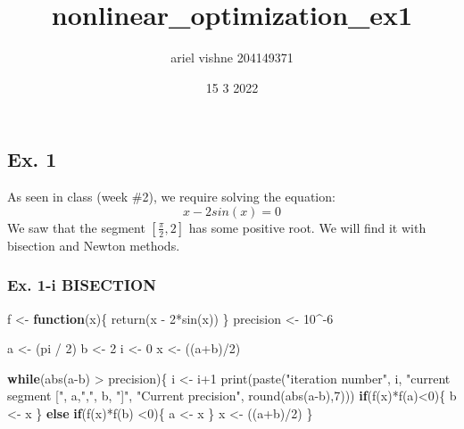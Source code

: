 \documentclass[
]{article}
\title{nonlinear\_optimization\_ex1}
\author{ariel vishne 204149371}
\date{15 3 2022}
\newenvironment{Shaded}{\begin{snugshade}}{\end{snugshade}}
\newcommand{\ControlFlowTok}[1]{\textcolor[rgb]{0.13,0.29,0.53}{\textbf{#1}}}
\newcommand{\DecValTok}[1]{\textcolor[rgb]{0.00,0.00,0.81}{#1}}
\newcommand{\FunctionTok}[1]{\textcolor[rgb]{0.00,0.00,0.00}{#1}}
\newcommand{\NormalTok}[1]{#1}
\newcommand{\OtherTok}[1]{\textcolor[rgb]{0.56,0.35,0.01}{#1}}
\newcommand{\SpecialCharTok}[1]{\textcolor[rgb]{0.00,0.00,0.00}{#1}}
\newcommand{\StringTok}[1]{\textcolor[rgb]{0.31,0.60,0.02}{#1}}
\begin{document}
\maketitle

\hypertarget{ex.-1}{%
\subsection{Ex. 1}\label{ex.-1}}

As seen in class (week \#2), we require solving the equation: \[
    x - 2sin(x) = 0
\] We saw that the segment \([\frac{\pi}{2}, 2]\) has some positive
root. We will find it with bisection and Newton methods.

\hypertarget{ex.-1-i-bisection}{%
\subsubsection{Ex. 1-i BISECTION}\label{ex.-1-i-bisection}}

\begin{Shaded}
\begin{Highlighting}[]
\NormalTok{f }\OtherTok{\textless{}{-}} \ControlFlowTok{function}\NormalTok{(x)\{}
  \FunctionTok{return}\NormalTok{(x }\SpecialCharTok{{-}} \DecValTok{2}\SpecialCharTok{*}\FunctionTok{sin}\NormalTok{(x))}
\NormalTok{\}}
\NormalTok{precision }\OtherTok{\textless{}{-}} \DecValTok{10}\SpecialCharTok{\^{}{-}}\DecValTok{6}


\NormalTok{a }\OtherTok{\textless{}{-}}\NormalTok{ (pi }\SpecialCharTok{/} \DecValTok{2}\NormalTok{)}
\NormalTok{b }\OtherTok{\textless{}{-}} \DecValTok{2}
\NormalTok{i }\OtherTok{\textless{}{-}} \DecValTok{0}
\NormalTok{x }\OtherTok{\textless{}{-}}\NormalTok{ ((a}\SpecialCharTok{+}\NormalTok{b)}\SpecialCharTok{/}\DecValTok{2}\NormalTok{)}

\ControlFlowTok{while}\NormalTok{(}\FunctionTok{abs}\NormalTok{(a}\SpecialCharTok{{-}}\NormalTok{b) }\SpecialCharTok{\textgreater{}}\NormalTok{ precision)\{}
\NormalTok{  i }\OtherTok{\textless{}{-}}\NormalTok{ i}\SpecialCharTok{+}\DecValTok{1}
  \FunctionTok{print}\NormalTok{(}\FunctionTok{paste}\NormalTok{(}\StringTok{"iteration number"}\NormalTok{, i, }\StringTok{"current segment ["}\NormalTok{, a,}\StringTok{","}\NormalTok{, b, }\StringTok{"]"}\NormalTok{, }\StringTok{"Current precision"}\NormalTok{, }\FunctionTok{round}\NormalTok{(}\FunctionTok{abs}\NormalTok{(a}\SpecialCharTok{{-}}\NormalTok{b),}\DecValTok{7}\NormalTok{)))}
  \ControlFlowTok{if}\NormalTok{(}\FunctionTok{f}\NormalTok{(x)}\SpecialCharTok{*}\FunctionTok{f}\NormalTok{(a)}\SpecialCharTok{\textless{}}\DecValTok{0}\NormalTok{)\{}
\NormalTok{    b }\OtherTok{\textless{}{-}}\NormalTok{ x}
\NormalTok{  \}}
  \ControlFlowTok{else} \ControlFlowTok{if}\NormalTok{(}\FunctionTok{f}\NormalTok{(x)}\SpecialCharTok{*}\FunctionTok{f}\NormalTok{(b) }\SpecialCharTok{\textless{}}\DecValTok{0}\NormalTok{)\{}
\NormalTok{    a }\OtherTok{\textless{}{-}}\NormalTok{ x}
\NormalTok{  \}}
\NormalTok{  x }\OtherTok{\textless{}{-}}\NormalTok{ ((a}\SpecialCharTok{+}\NormalTok{b)}\SpecialCharTok{/}\DecValTok{2}\NormalTok{)}
\NormalTok{\}}
\end{Highlighting}
\end{Shaded}
\end{document}
